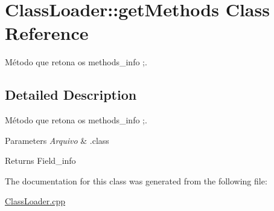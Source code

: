 \hypertarget{class_class_loader_1_1get_methods}{}\section{Class\+Loader\+:\+:get\+Methods Class Reference}
\label{class_class_loader_1_1get_methods}


Método que retona os methods\+\_\+info ;.  




\subsection{Detailed Description}
Método que retona os methods\+\_\+info ;. 


\begin{DoxyParams}{Parameters}
{\em Arquivo} & .class \\
\hline
\end{DoxyParams}
\begin{DoxyReturn}{Returns}
Field\+\_\+info 
\end{DoxyReturn}


The documentation for this class was generated from the following file\+:\begin{DoxyCompactItemize}
\item 
\hyperlink{_class_loader_8cpp}{Class\+Loader.\+cpp}\end{DoxyCompactItemize}
